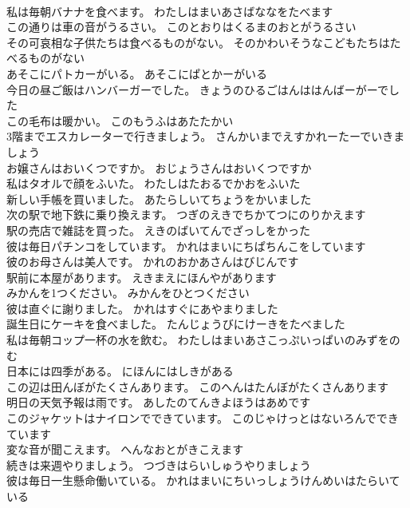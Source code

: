 \documentclass[8pt]{extreport}
\begin{document}
\begin{CJK}{UTF8}{min}
\\	私は毎朝バナナを食べます。	わたしはまいあさばななをたべます 
\\	この通りは車の音がうるさい。	このとおりはくるまのおとがうるさい 
\\	その可哀相な子供たちは食べるものがない。	そのかわいそうなこどもたちはたべるものがない 
\\	あそこにパトカーがいる。	あそこにぱとかーがいる 
\\	今日の昼ご飯はハンバーガーでした。	きょうのひるごはんははんばーがーでした 
\\	この毛布は暖かい。	このもうふはあたたかい 
\\	3階までエスカレーターで行きましょう。	さんかいまでえすかれーたーでいきましょう 
\\	お嬢さんはおいくつですか。	おじょうさんはおいくつですか 
\\	私はタオルで顔をふいた。	わたしはたおるでかおをふいた 
\\	新しい手帳を買いました。	あたらしいてちょうをかいました 
\\	次の駅で地下鉄に乗り換えます。	つぎのえきでちかてつにのりかえます 
\\	駅の売店で雑誌を買った。	えきのばいてんでざっしをかった 
\\	彼は毎日パチンコをしています。	かれはまいにちぱちんこをしています 
\\	彼のお母さんは美人です。	かれのおかあさんはびじんです 
\\	駅前に本屋があります。	えきまえにほんやがあります 
\\	みかんを1つください。	みかんをひとつください 
\\	彼は直ぐに謝りました。	かれはすぐにあやまりました 
\\	誕生日にケーキを食べました。	たんじょうびにけーきをたべました 
\\	私は毎朝コップ一杯の水を飲む。	わたしはまいあさこっぷいっぱいのみずをのむ 
\\	日本には四季がある。	にほんにはしきがある 
\\	この辺は田んぼがたくさんあります。	このへんはたんぼがたくさんあります 
\\	明日の天気予報は雨です。	あしたのてんきよほうはあめです 
\\	このジャケットはナイロンでできています。	このじゃけっとはないろんでできています 
\\	変な音が聞こえます。	へんなおとがきこえます 
\\	続きは来週やりましょう。	つづきはらいしゅうやりましょう 
\\	彼は毎日一生懸命働いている。	かれはまいにちいっしょうけんめいはたらいている 

\end{CJK}
\end{document}
